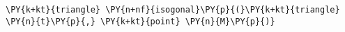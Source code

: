 \begin{Verbatim}[commandchars=\\\{\}]
    \PY{k+kt}{triangle} \PY{n+nf}{isogonal}\PY{p}{(}\PY{k+kt}{triangle} \PY{n}{t}\PY{p}{,} \PY{k+kt}{point} \PY{n}{M}\PY{p}{)}
\end{Verbatim}
